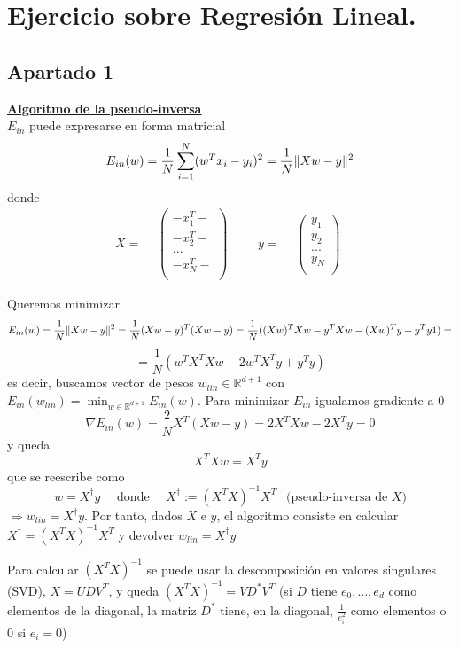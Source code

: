 \documentclass[11pt,a4paper]{article}
\DeclarePairedDelimiter{\norm}{\lVert}{\rVert}
\theoremstyle{definition}
\newcommand{\R}{\mathbb{R}}
\begin{document}
    \section{Ejercicio sobre Regresión Lineal.}
    
	\subsection{Apartado 1}
	
    \underline{\bf Algoritmo de la pseudo-inversa}\\
    
    $E_{in}$ puede expresarse en forma matricial
	$$E_{in}(w)=\frac{1}{N} \sum_{i=1}^N (w^Tx_i -y_i)^2=\frac{1}{N}\norm{Xw-y}^2$$
	donde
	$$
	X=\begin{matrix}
	& \left(\begin{matrix}
	- x_1^T - \\
	- x_2^T - \\
	...  \\
	- x_N^T - \\


	\end{matrix}\right)
	\end{matrix}
		\quad \quad 
	y=\begin{matrix}
	& \left(\begin{matrix}
	y_1 \\
	y_2 \\
	...  \\
	y_N  \\


	\end{matrix}\right)
	\end{matrix}
	$$
	
	Queremos minimizar
	$$E_{in}(w)=\frac{1}{N}\norm{Xw-y}^2=\frac{1}{N}(Xw-y)^T(Xw-y)=\frac{1}{N}((Xw)^TXw-y^TXw-(Xw)^Ty+y^Ty1)=$$ $$=\frac{1}{N} (w^TX^TXw-2w^TX^Ty+y^Ty)$$
	es decir, buscamos vector de pesos $w_{lin} \in \R^{d+1}$ con $E_{in}(w_{lin})=\min_{w\in \R^{d+1}} E_{in}(w)$. Para minimizar $E_{in}$ igualamos gradiente a 0
	$$\nabla E_{in}(w)=\frac{2}{N} X^T (Xw-y)=2X^TXw-2X^Ty=0$$
	y queda
	$$X^TXw= X^Ty$$
	que se reescribe como
	$$w=X^\dagger y \quad \text{ donde } \quad X^\dagger :=(X^TX)^{-1}X^T \ \ \text{ (pseudo-inversa de } X\text{)}$$
	$\Rightarrow w_{lin}=X^\dagger y$.
	Por tanto, dados $X$ e $y$, el algoritmo consiste en calcular $X^\dagger =(X^TX)^{-1}X^T$ y devolver $w_{lin}=X^\dagger y$
	
	Para calcular $(X^TX)^{-1}$ se puede usar la descomposición en valores singulares (SVD), $X=UDV^T$, y queda $(X^TX)^{-1}=VD^*V^T$ (si $D$ tiene $e_0,\ldots,e_d$ como elementos de la diagonal, la matriz $D^*$ tiene, en la diagonal, $\frac{1}{e_i^2}$ como elementos o $0$ si $e_i=0$) \\
	
\end{document}
